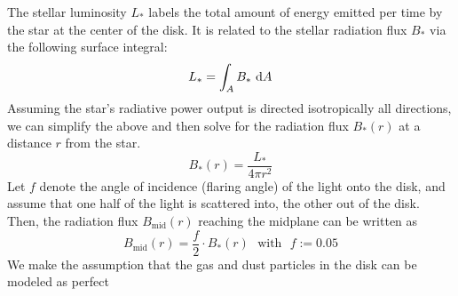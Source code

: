 

    The stellar luminosity $L_*$ labels the total amount of energy emitted per time by the star at 
    the center of the disk. It is related to the stellar radiation flux $B_*$ via the following 
    surface integral:
    \begin{equation}
        L_* = \int_A B_*\ \text d A
    \end{equation}
    Assuming the star's radiative power output is directed isotropically all directions,
    we can simplify the above and then solve for the radiation flux $B_*(r)$ at 
    a distance $r$ from the star.
    \begin{equation}
        B_*(r) = \frac{L_*}{4\pi r^2}
    \end{equation}
    Let $f$ denote the angle of incidence (flaring angle) of the light onto the disk, and assume
    that one half of the light is scattered into, the other out of the disk.
    Then, the radiation flux $B_\text{mid}(r)$ reaching the midplane can be written as
    \begin{equation}
        B_\text{mid}(r) = \frac{f}{2} \cdot B_*(r)
        \ \ \ \text{with}\ \ \
        f := 0.05
    \end{equation}
    We make the assumption that the gas and dust particles in the disk can be modeled as perfect 
